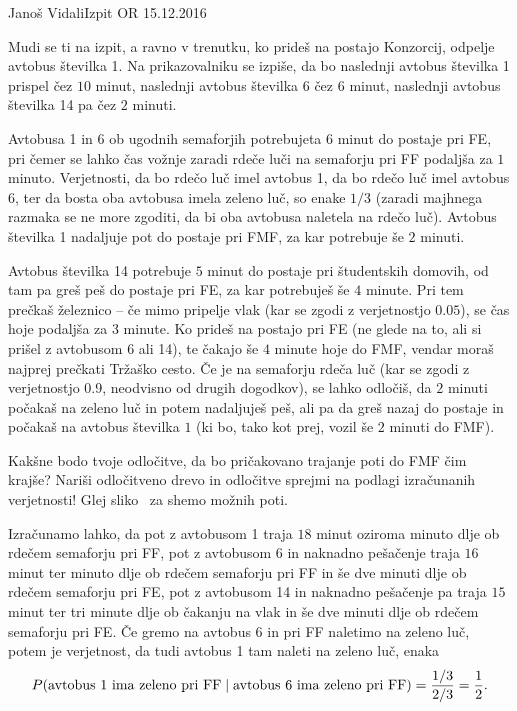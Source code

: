 \begin{naloga}{Janoš Vidali}{Izpit OR 15.12.2016}
\begin{vprasanje}
Mudi se ti na izpit, a ravno v trenutku,
ko prideš na postajo Konzorcij, odpelje avtobus številka 1.
Na prikazovalniku se izpiše,
da bo naslednji avtobus številka 1 prispel čez $10$ minut,
naslednji avtobus številka 6 čez $6$ minut,
naslednji avtobus številka 14 pa čez $2$ minuti.

Avtobusa 1 in 6 ob ugodnih semaforjih potrebujeta $6$ minut do postaje pri FE,
pri čemer se lahko čas vož\-nje zaradi rdeče luči na semaforju pri FF
podaljša za $1$ minuto.
Verjetnosti, da bo rdečo luč imel avtobus 1, da bo rdečo luč imel avtobus 6,
ter da bosta oba avtobusa imela zeleno luč, so enake $1/3$
(zaradi majhnega razmaka se ne more zgoditi,
da bi oba avtobusa naletela na rdečo luč).
Avtobus številka 1 nadaljuje pot do postaje pri FMF,
za kar potrebuje še $2$ minuti.

Avtobus številka 14 potrebuje $5$ minut do postaje pri študentskih domovih,
od tam pa greš peš do postaje pri FE, za kar potrebuješ še $4$ minute.
Pri tem prečkaš že\-lez\-ni\-co -- če mimo pripelje vlak
(kar se zgodi z verjetnostjo $0.05$),
se čas hoje podaljša za $3$ minute.
Ko prideš na postajo pri FE
(ne glede na to, ali si prišel z avtobusom 6 ali 14),
te čakajo še $4$ minute hoje do FMF,
vendar moraš najprej prečkati Tržaško cesto.
Če je na semaforju rdeča luč
(kar se zgodi z verjetnostjo 0.9, neodvisno od drugih dogodkov),
se lahko odločiš, da $2$ minuti počakaš na zeleno luč in potem nadaljuješ peš,
ali pa da greš nazaj do postaje in počakaš na avtobus številka $1$
(ki bo, tako kot prej, vozil še $2$ minuti do FMF).

Kakšne bodo tvoje odločitve,
da bo pričakovano trajanje poti do FMF čim krajše?
Nariši od\-lo\-čit\-ve\-no drevo
in odločitve sprejmi na podlagi izračunanih verjetnosti!
Glej sliko~\fig{} za shemo možnih poti.

\begin{slika}
\pgfslika
{}
\end{slika}
\end{vprasanje}

\begin{odgovor}
Izračunamo lahko,
da pot z avtobusom 1 traja $18$ minut
oziroma minuto dlje ob rdečem semaforju pri FF,
pot z avtobusom 6 in naknadno pešačenje traja $16$ minut
ter minuto dlje ob rdečem semaforju pri FF
in še dve minuti dlje ob rdečem semaforju pri FE,
pot z avtobusom 14 in naknadno pešačenje pa traja $15$ minut
ter tri minute dlje ob čakanju na vlak
in še dve minuti dlje ob rdečem semaforju pri FE.
Če gremo na avtobus 6 in pri FF naletimo na zeleno luč,
potem je verjetnost, da tudi avtobus 1 tam naleti na zeleno luč, enaka
$$
P(\text{avtobus 1 ima zeleno pri FF} \;|\; \text{avtobus 6 ima zeleno pri FF})
= {1/3 \over 2/3} = {1 \over 2} .
$$


\end{odgovor}
\end{naloga}
